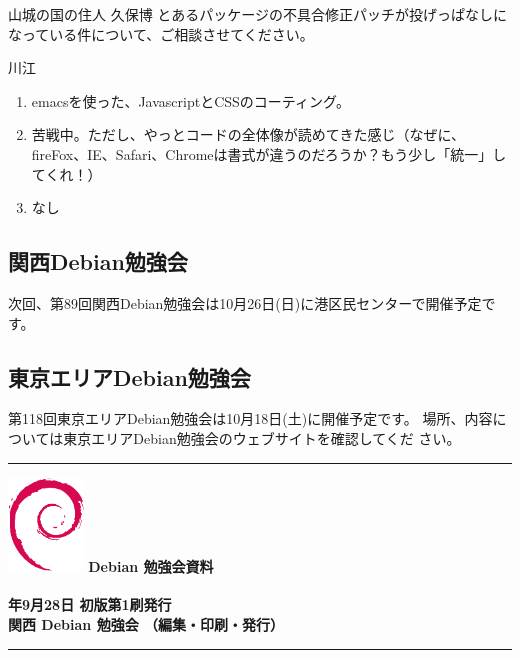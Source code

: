 \documentclass[mingoth,a4paper]{jsarticle}
\newcommand{\debmtgyear}{2014}
\newcommand{\debmtgdate}{28}
\newcommand{\debmtgmonth}{9}
\begin{document}
\begin{prework}{ 山城の国の住人 久保博 }
とあるパッケージの不具合修正パッチが投げっぱなしになっている件について、ご相談させてください。
\end{prework}

\begin{prework}{ 川江 }
  \begin{enumerate}
  \item emacsを使った、JavascriptとCSSのコーティング。
  \item 苦戦中。ただし、やっとコードの全体像が読めてきた感じ（なぜに、fireFox、IE、Safari、Chromeは書式が違うのだろうか？もう少し「統一」してくれ！）
  \item なし
  \end{enumerate}
\end{prework}



\subsection{関西Debian勉強会}

次回、第89回関西Debian勉強会は10月26日(日)に港区民センターで開催予定で
す。

\subsection{東京エリアDebian勉強会}

第118回東京エリアDebian勉強会は10月18日(土)に開催予定です。
場所、内容については東京エリアDebian勉強会のウェブサイトを確認してくだ
さい。

%

\printindex

 \begin{minipage}[b]{0.2\hsize}
 \end{minipage}
 \begin{minipage}[b]{0.8\hsize}

 \vspace*{15cm}
 \rule{\hsize}{1mm}
 \vspace{2mm}
 \includegraphics[width=2cm]{image200502/openlogo-nd.eps}
 \noindent \Large \bfseries{Debian 勉強会資料}\\ \\
 \noindent \normalfont \debmtgyear{}年\debmtgmonth{}月\debmtgdate{}日 \hspace{5mm}  初版第1刷発行\\
 \noindent \normalfont 関西 Debian 勉強会 （編集・印刷・発行）\\
 \rule{\hsize}{1mm}
 \end{minipage}
\end{document}
